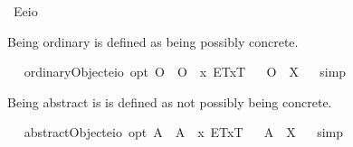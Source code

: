 \begin{isabellebody}
\ E{\isacharcolon}{\isacharcolon}{\isachardoublequoteopen}{\isacharparenleft}e{\isasymRightarrow}io{\isacharparenright}{\isachardoublequoteclose}%
\begin{isamarkuptext}%
Being ordinary is defined as being possibly concrete.%
\end{isamarkuptext}%
\isamarkuptrue%
\ \isamarkupfalse%
\ ordinaryObject{\isacharcolon}{\isacharcolon}{\isachardoublequoteopen}{\isacharparenleft}e{\isasymRightarrow}io{\isacharparenright}\ opt{\isachardoublequoteclose}\ {\isacharparenleft}{\isachardoublequoteopen}O{\isacharbang}{\isachardoublequoteclose}{\isacharparenright}\ \ {\isachardoublequoteopen}O{\isacharbang}\ {\isasymequiv}\ \isactrlbold {\isasymlambda}x{\isachardot}\ \isactrlbold {\isasymdiamond}{\isasymlparr}E\isactrlsup T{\isacharcomma}x\isactrlsup T{\isasymrparr}{\isachardoublequoteclose}\isanewline
\isanewline
\ \isamarkupfalse%
\ {\isachardoublequoteopen}O{\isacharbang}\ {\isacharequal}\ X{\isachardoublequoteclose}%
\isadelimproof
\ %
\endisadelimproof
%
\isatagproof
{}\isamarkupfalse%
\ simp\ \isamarkupfalse%
\ \ \ \ \ \ \ %
%
\endisatagproof
{\isafoldproof}%
%
\isadelimproof
%
\endisadelimproof
%
\begin{isamarkuptext}%
Being abstract is is defined as not possibly being concrete.%
\end{isamarkuptext}%
\isamarkuptrue%
\ \isamarkupfalse%
\ abstractObject{\isacharcolon}{\isacharcolon}{\isachardoublequoteopen}{\isacharparenleft}e{\isasymRightarrow}io{\isacharparenright}\ opt{\isachardoublequoteclose}\ {\isacharparenleft}{\isachardoublequoteopen}A{\isacharbang}{\isachardoublequoteclose}{\isacharparenright}\ \ {\isachardoublequoteopen}A{\isacharbang}\ {\isasymequiv}\ \isactrlbold {\isasymlambda}x{\isachardot}\ \isactrlbold {\isasymnot}{\isacharparenleft}\isactrlbold {\isasymdiamond}{\isasymlparr}E\isactrlsup T{\isacharcomma}x\isactrlsup T{\isasymrparr}{\isacharparenright}{\isachardoublequoteclose}\isanewline
\isanewline
\ \isamarkupfalse%
\ {\isachardoublequoteopen}A{\isacharbang}\ {\isacharequal}\ X{\isachardoublequoteclose}%
\isadelimproof
\ %
\endisadelimproof
%
\isatagproof
{}\isamarkupfalse%
\ simp\ \isamarkupfalse%
\ \ \ \ \ \ \ %
\end{isabellebody}
